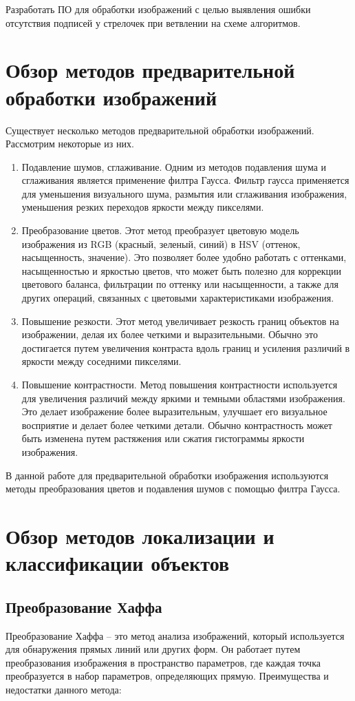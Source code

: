 \documentclass[12pt]{report}
\begin{document}
Разработать ПО для обработки изображений с целью выявления ошибки отсутствия подписей у стрелочек при ветвлении на схеме алгоритмов.

\section{Обзор методов предварительной обработки изображений}
Существует несколько методов предварительной обработки изображений. Рассмотрим некоторые из них.
\begin{enumerate}
    \item Подавление шумов, сглаживание.
Одним из методов подавления шума и сглаживания является применение филтра Гаусса. 
Фильтр гаусса применяется для уменьшения визуального шума, размытия или сглаживания изображения, уменьшения резких переходов яркости между пикселями.
    \item Преобразование цветов.
   Этот метод преобразует цветовую модель изображения из RGB (красный, зеленый, синий) в HSV (оттенок, насыщенность, значение). 
   Это позволяет более удобно работать с оттенками, насыщенностью и яркостью цветов, что может быть полезно для коррекции цветового баланса, фильтрации по оттенку или насыщенности, а также для других операций, связанных с цветовыми характеристиками изображения.
   \item Повышение резкости.
   Этот метод увеличивает резкость границ объектов на изображении, делая их более четкими и выразительными. 
   Обычно это достигается путем увеличения контраста вдоль границ и усиления различий в яркости между соседними пикселями.
   \item Повышение контрастности.
   Метод повышения контрастности используется для увеличения различий между яркими и темными областями изображения.
   Это делает изображение более выразительным, улучшает его визуальное восприятие и делает более четкими детали. 
   Обычно контрастность может быть изменена путем растяжения или сжатия гистограммы яркости изображения.
\end{enumerate}

В данной работе для предварительной обработки изображения используются методы преобразования цветов и подавления шумов с помощью филтра Гаусса.

\section{Обзор методов локализации и классификации объектов}
\subsection{Преобразование Хаффа}
Преобразование Хаффа -- это метод анализа изображений, который используется для обнаружения прямых линий или других форм. Он работает путем преобразования изображения в пространство параметров, где каждая точка преобразуется в набор параметров, определяющих прямую. Преимущества и недостатки данного метода:
\end{document}
